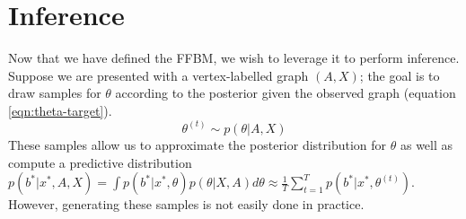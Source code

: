 \section{Inference}
\label{sec:inference}

Now that we have defined the FFBM, we wish to leverage it to perform inference. Suppose we are presented with a vertex-labelled graph $(A, X)$; the goal is to draw samples for $\theta$ according to the posterior given the observed graph (equation \ref{eqn:theta-target}). 
%
\begin{equation}
	\label{eqn:theta-target}
	\theta^{(t)} \sim p(\theta | A, X)
\end{equation}
%
These samples allow us to approximate the posterior distribution for $\theta$ as well as compute a predictive distribution $p(b^* | x^*, A, X) = \int p(b^* | x^*, \theta) p(\theta | X, A) d\theta \approx \frac{1}{T} \sum_{t=1}^{T} p(b^* | x^*, \theta^{(t)})$. However, generating these samples is not easily done in practice.

